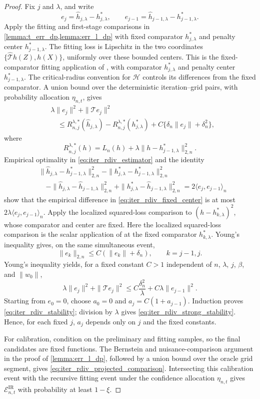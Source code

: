 \begin{proof}
Fix $j$ and $\lambda$, and write
\[
e_j=\hat h_{j,\lambda}-h_{j,\lambda}^*, \qquad e_{j-1}=\hat h_{j-1,\lambda}-h_{j-1,\lambda}^*.
\]
Apply the fitting and first-stage comparisons in
\cref{lemma:t_err_dp,lemma:err_l_dp} with fixed comparator
$h_{j,\lambda}^*$ and penalty center $h_{j-1,\lambda}^*$.
The fitting loss is Lipschitz in the two coordinates
$\{\hat{\mathcal T}h(Z),h(X)\}$, uniformly over these bounded centers. This is the fixed-comparator fitting application of \citet[Lemma~14]{foster2023orthogonal}, with comparator $h_{j,\lambda}^*$ and penalty center $h_{j-1,\lambda}^*$.
The critical-radius convention for $\mathcal H$ controls its differences
from the fixed comparator. A union bound over the deterministic
iteration--grid pairs, with probability allocation $\eta_{n,t}$, gives
\begin{align}
&\lambda\|e_j\|^2+\|\mathcal T e_j\|^2\nonumber\\
&\quad\leqslant
R_{n,j}^{\lambda,*}(\hat h_{j,\lambda})
-R_{n,j}^{\lambda,*}(h_{j,\lambda}^*)
+C\{\delta_n\|e_j\|+\delta_n^2\},
\label{eq:iter_rdiv_fixed_center}
\end{align}
where
\[
R_{n,j}^{\lambda,*}(h) =L_n(h)+\lambda\|h-h_{j-1,\lambda}^*\|_{2,n}^2.
\]
Empirical optimality in \eqref{eq:iter_rdiv_estimator} and the identity
\begin{align*}
&\|\hat h_{j,\lambda}-h_{j-1,\lambda}^*\|_{2,n}^2
-\|h_{j,\lambda}^*-h_{j-1,\lambda}^*\|_{2,n}^2\\
&\quad-
\|\hat h_{j,\lambda}-\hat h_{j-1,\lambda}\|_{2,n}^2
+\|h_{j,\lambda}^*-\hat h_{j-1,\lambda}\|_{2,n}^2
=2\langle e_j,e_{j-1}\rangle_n
\end{align*}
show that the empirical difference in \eqref{eq:iter_rdiv_fixed_center} is at most $2\lambda\langle e_j,e_{j-1}\rangle_n$.
Apply the localized squared-loss comparison to
$(h-h_{k,\lambda}^*)^2$, whose comparator and center are fixed. Here the localized squared-loss comparison is the scalar application of \citet[Lemma~14]{foster2023orthogonal} at the fixed comparator $h_{k,\lambda}^*$.
Young's inequality gives, on the same simultaneous event,
\[
\|e_k\|_{2,n}\leqslant C(\|e_k\|+\delta_n), \qquad k=j-1,j.
\]
Young's inequality yields, for a fixed constant $C>1$ independent of
$n$, $\lambda$, $j$, $\beta$, and $\|w_0\|$,
\[
\lambda\|e_j\|^2+\|\mathcal T e_j\|^2
\leqslant
C\frac{\delta_n^2}{\lambda}+C\lambda\|e_{j-1}\|^2.
\]
Starting from $e_0=0$, choose $a_0=0$ and
$a_j=C(1+a_{j-1})$. Induction proves
\eqref{eq:iter_rdiv_stability}; division by $\lambda$ gives
\eqref{eq:iter_rdiv_strong_stability}. Hence, for each fixed $j$, $a_j$
depends only on $j$ and the fixed constants.

For calibration, condition on the preliminary and fitting samples, so the final candidates are fixed functions. The Bernstein and nuisance-comparison argument in the proof of \cref{lemma:err_l_dp}, followed by a union bound over the oracle grid segment, gives \eqref{eq:iter_rdiv_projected_comparison}. Intersecting this calibration event with the recursive fitting event under the confidence allocation $\eta_{n,t}$ gives $\mathcal E_{n,t}^{\mathrm{IR}}$ with probability at least $1-\xi$.
\end{proof}


